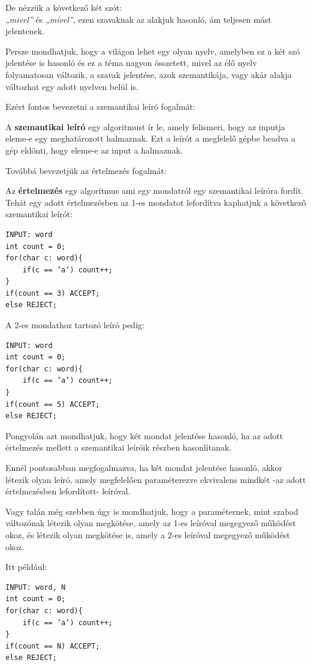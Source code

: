 \documentclass[12pt]{report}
\theoremstyle{definition}
\begin{document}
De nézzük a következő két szót:\\
\textit{„mivel”} és  \textit{„mível”}, ezen szavaknak az alakjuk hasonló, ám teljesen mást jelentenek.

Persze mondhatjuk, hogy a világon lehet egy olyan nyelv, amelyben ez a két szó jelentése is hasonló és ez a téma nagyon összetett, mivel az élő nyelv folyamatosan változik, a szavak jelentése, azok szemantikája, vagy akár alakja változhat egy adott nyelven belül is.

Ezért fontos bevezetni a szemantikai leíró fogalmát:

A \textbf{szemantikai leíró} egy algoritmust ír le, amely felismeri, hogy az inputja eleme-e egy meghatározott halmaznak. Ezt a leírót a megfelelő gépbe beadva a gép eldönti, hogy eleme-e az input a halmaznak.

Továbbá bevezetjük az értelmezés fogalmát:

Az \textbf{értelmezés} egy algoritmus ami egy mondatról egy szemantikai leíróra fordít.
Tehát egy adott értelmezésben az 1-es mondatot lefordítva kaphatjuk a következő szemantikai leírót:
\begin{verbatim}
INPUT: word
int count = 0;
for(char c: word){
	if(c == ’a’) count++;
}
if(count == 3) ACCEPT;
else REJECT;
\end{verbatim}

A 2-es mondathoz tartozó leíró pedig:
\begin{verbatim}
INPUT: word
int count = 0;
for(char c: word){
	if(c == ’a’) count++;
}
if(count == 5) ACCEPT;
else REJECT;
\end{verbatim}

Pongyolán azt mondhatjuk, hogy két mondat jelentése hasonló, ha az adott értelmezés mellett a szemantikai leíróik részben hasonlítanak.

Ennél pontosabban megfogalmazva, ha két mondat jelentése hasonló, akkor létezik olyan leíró, amely megfelelően paraméterezve ekvivalens mindkét -az adott értelmezésben lefordított- leíróval. 

Vagy talán még szebben úgy is mondhatjuk, hogy a paraméternek, mint szabad változónak létezik olyan megkötése, amely az 1-es leíróval megegyező működést okoz, és létezik olyan megkötése is, amely a 2-es leíróval megegyező működést okoz.

Itt például:

\begin{verbatim}
INPUT: word, N
int count = 0;
for(char c: word){
	if(c == ’a’) count++;
}
if(count == N) ACCEPT;
else REJECT;
\end{verbatim}
\end{document}

